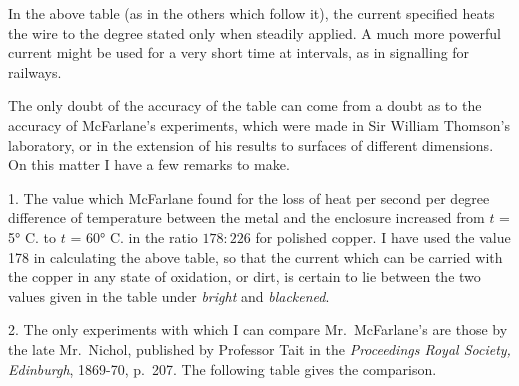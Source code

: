 \documentclass[12pt,oneside]{book}[2021/10/04]
\begin{document}
In the above table (as in the others which follow it), the current
specified heats the wire to the degree stated only when
steadily applied. A much more powerful current might be used
for a very short time at intervals, as in signalling for railways.

The only doubt of the accuracy of the table can come from
a doubt as to the accuracy of McFarlane's experiments, which
were made in Sir William Thomson's laboratory, or in the
extension of his results to surfaces of different dimensions. On
this matter I have a few remarks to make.

1. The value which McFarlane found for the loss of heat
per second per degree difference of temperature between the
metal and the enclosure increased from \(t\) = 5° C. to \(t\) = 60° C.
in the ratio \(178 : 226\) for polished copper. I have used the
value 178 in calculating the above table, so that the current
which can be carried with the copper in any state of oxidation,
or dirt, is certain to lie between the two values given in the table
under \textit{bright} and \textit{blackened}.

2. The only experiments with which I can compare Mr.\
McFarlane's are those by the late Mr.\ Nichol, published by
Professor Tait in the \textit{Proceedings Royal Society, Edinburgh},
1869-70, p.\ 207. The following table gives the comparison.
\end{document}
